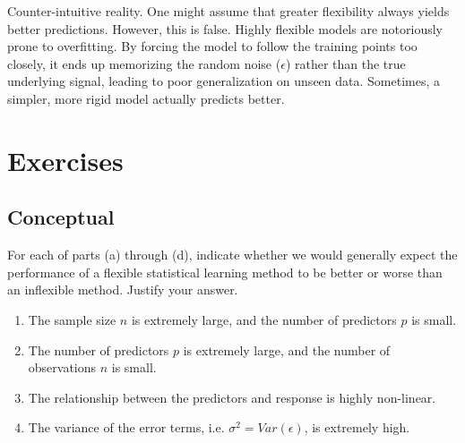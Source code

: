 \documentclass[12pt]{report}
\begin{document}
{\color{codeblue}Counter-intuitive reality.} One might assume that greater flexibility always yields better predictions. However, this is false. Highly flexible models are notoriously prone to overfitting. By forcing the model to follow the training points too closely, it ends up memorizing the random noise ($\epsilon$) rather than the true underlying signal, leading to poor generalization on unseen data. Sometimes, a simpler, more rigid model actually predicts better.



\newpage
\section*{Exercises}
\subsection*{\color{codeblue}Conceptual}
\begin{exercise}
For each of parts (a) through (d), indicate whether we would generally expect the performance of a flexible statistical learning method to be better or worse than an inflexible method. Justify your answer.
\begin{enumerate}
    \item[(a)] The sample size $n$ is extremely large, and the number of predictors $p$ is small.
    \item[(b)] The number of predictors $p$ is extremely large, and the number of observations $n$ is small.
    \item[(c)] The relationship between the predictors and response is highly non-linear.
    \item[(d)] The variance of the error terms, i.e. $\sigma^{2}=Var(\epsilon)$, is extremely high.
\end{enumerate}
\end{exercise}

\begin{solution}
    
\end{solution}
\end{document}

